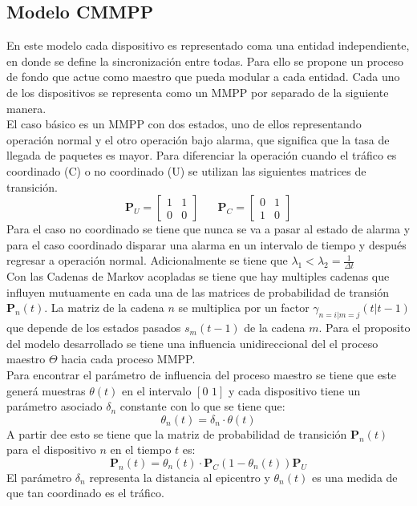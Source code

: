 \documentclass[journal]{IEEEtran}
\begin{document}
\subsection{Modelo CMMPP}
En este modelo cada dispositivo es representado coma una entidad independiente, en donde se define la sincronizaci\'on entre todas. Para ello se propone un proceso de fondo que actue como maestro que pueda modular a cada entidad. Cada uno de los dispositivos se representa como un MMPP por separado de la siguiente manera.\\

El caso b\'asico es un MMPP con dos estados, uno de ellos representando operaci\'on normal y el otro operaci\'on bajo alarma, que significa que la tasa de llegada de paquetes es mayor. Para diferenciar la operaci\'on cuando el tr\'afico es coordinado (C) o no coordinado (U) se utilizan las siguientes matrices de transici\'on.
$$\mathbf{P}_U=\left[\begin{array}{cc}
1 & 1\\
0 & 0
\end{array}\right]\hspace{20pt}\mathbf{P}_C=\left[\begin{array}{cc}
0 & 1\\
1 & 0
\end{array}\right]
$$
Para el caso no coordinado se tiene que nunca se va a pasar al estado de alarma y para el caso coordinado disparar una alarma en un intervalo de tiempo y despu\'es regresar a operaci\'on normal. Adicionalmente se tiene que $\lambda_1<\lambda_2=\frac{1}{\Delta t}$\\

Con las Cadenas de Markov acopladas se tiene que hay multiples cadenas que influyen mutuamente en cada una de las matrices de probabilidad de transi\'on $\mathbf{P}_n(t)$. La matriz de la cadena $n$ se multiplica por un factor $\gamma_{n=i|m=j}(t|t-1)$ que depende de los estados pasados $s_m(t-1)$ de la cadena $m$. Para el proposito del modelo desarrollado se tiene una influencia unidireccional del el proceso maestro $\Theta$ hacia cada proceso MMPP.\\

Para encontrar el par\'ametro de influencia del proceso maestro se tiene que este gener\'a muestras $\theta(t)$ en el intervalo $[0\hspace{4pt}1]$ y cada dispositivo tiene un par\'ametro asociado $\delta_n$ constante con lo que se tiene que:
$$\theta_n(t)=\delta_n\cdot\theta(t)$$
A partir dee esto se tiene que la matriz de probabilidad de transici\'on $\mathbf{P}_n(t)$ para el dispositivo $n$ en el tiempo $t$ es:
$$\mathbf{P}_n(t)=\theta_n(t)\cdot \mathbf{P}_C(1-\theta_n(t))\mathbf{P}_U$$
El par\'ametro $\delta_n$ representa la distancia al epicentro y $\theta_n(t)$ es una medida de que tan coordinado es el tr\'afico.
\end{document}

